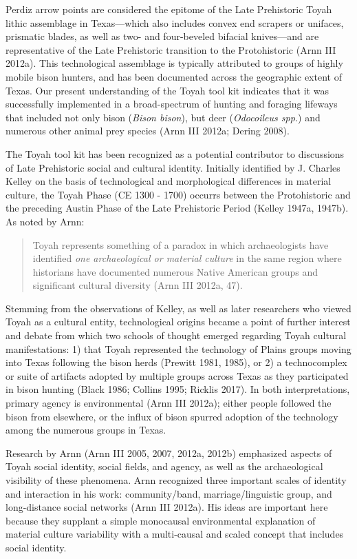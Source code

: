 \documentclass[smallextended]{svjour3}       %
\begin{document}
Perdiz arrow points are considered the epitome of the Late Prehistoric
Toyah lithic assemblage in Texas---which also includes convex end
scrapers or unifaces, prismatic blades, as well as two- and four-beveled
bifacial knives---and are representative of the Late Prehistoric
transition to the Protohistoric (Arnn III 2012a). This technological
assemblage is typically attributed to groups of highly mobile bison
hunters, and has been documented across the geographic extent of Texas.
Our present understanding of the Toyah tool kit indicates that it was
successfully implemented in a broad-spectrum of hunting and foraging
lifeways that included not only bison (\emph{Bison bison}), but deer
(\emph{Odocoileus spp.}) and numerous other animal prey species (Arnn
III 2012a; Dering 2008).

The Toyah tool kit has been recognized as a potential contributor to
discussions of Late Prehistoric social and cultural identity. Initially
identified by J. Charles Kelley on the basis of technological and
morphological differences in material culture, the Toyah Phase (CE 1300
- 1700) occurrs between the Protohistoric and the preceding Austin Phase
of the Late Prehistoric Period (Kelley 1947a, 1947b). As noted by Arnn:

\begin{quote}
Toyah represents something of a paradox in which archaeologists have
identified \emph{one archaeological or material culture} in the same
region where historians have documented numerous Native American groups
and significant cultural diversity (Arnn III 2012a, 47).
\end{quote}

Stemming from the observations of Kelley, as well as later researchers
who viewed Toyah as a cultural entity, technological origins became a
point of further interest and debate from which two schools of thought
emerged regarding Toyah cultural manifestations: 1) that Toyah
represented the technology of Plains groups moving into Texas following
the bison herds (Prewitt 1981, 1985), or 2) a technocomplex or suite of
artifacts adopted by multiple groups across Texas as they participated
in bison hunting (Black 1986; Collins 1995; Ricklis 2017). In both
interpretations, primary agency is environmental (Arnn III 2012a);
either people followed the bison from elsewhere, or the influx of bison
spurred adoption of the technology among the numerous groups in Texas.

Research by Arnn (Arnn III 2005, 2007, 2012a, 2012b) emphasized aspects
of Toyah social identity, social fields, and agency, as well as the
archaeological visibility of these phenomena. Arnn recognized three
important scales of identity and interaction in his work:
community/band, marriage/linguistic group, and long-distance social
networks (Arnn III 2012a). His ideas are important here because they
supplant a simple monocausal environmental explanation of material
culture variability with a multi-causal and scaled concept that includes
social identity.
\end{document}
